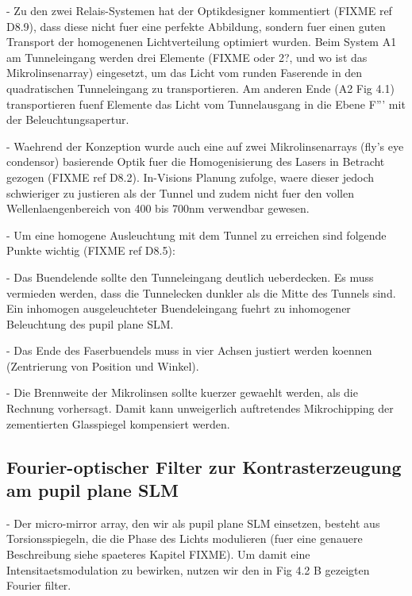


 - Zu den zwei Relais-Systemen hat der Optikdesigner kommentiert
   (FIXME ref D8.9), dass diese nicht fuer eine perfekte Abbildung,
   sondern fuer einen guten Transport der homogenenen Lichtverteilung    %
   optimiert wurden. Beim System A1 am Tunneleingang werden drei Elemente
   (FIXME oder 2?, und wo ist das Mikrolinsenarray) eingesetzt, um das
   Licht vom runden Faserende in den quadratischen Tunneleingang zu
   transportieren. Am anderen Ende (A2 Fig 4.1) transportieren fuenf Elemente das
   Licht vom Tunnelausgang in die Ebene F''' mit der
   Beleuchtungsapertur.

 - Waehrend der Konzeption wurde auch eine auf zwei Mikrolinsenarrays    %
   (fly's eye condensor) basierende Optik fuer die Homogenisierung des Lasers in
   Betracht gezogen (FIXME ref D8.2). In-Visions Planung zufolge,
   waere dieser jedoch schwieriger zu justieren als der Tunnel und
   zudem nicht fuer den vollen Wellenlaengenbereich von 400 bis 700nm
   verwendbar gewesen.

  - Um eine homogene Ausleuchtung mit dem Tunnel zu erreichen sind       %
    folgende Punkte wichtig (FIXME ref D8.5):

   - Das Buendelende sollte den Tunneleingang deutlich ueberdecken. Es
     muss vermieden werden, dass die Tunnelecken dunkler als die Mitte
     des Tunnels sind. Ein inhomogen ausgeleuchteter Buendeleingang
     fuehrt zu inhomogener Beleuchtung des pupil plane SLM.

   - Das Ende des Faserbuendels muss in vier Achsen justiert werden
     koennen (Zentrierung von Position und Winkel).

   - Die Brennweite der Mikrolinsen sollte kuerzer gewaehlt werden,
     als die Rechnung vorhersagt. Damit kann unweigerlich auftretendes
     Mikrochipping der zementierten Glasspiegel kompensiert werden.

\subsection{ Fourier-optischer Filter zur Kontrasterzeugung am pupil plane SLM}
  - Der micro-mirror array, den wir als pupil plane SLM einsetzen,        %
    besteht aus Torsionsspiegeln, die die Phase des Lichts modulieren
    (fuer eine genauere Beschreibung siehe spaeteres Kapitel               
    FIXME). Um damit eine Intensitaetsmodulation zu bewirken, nutzen
    wir den in Fig 4.2 B gezeigten Fourier filter. 

